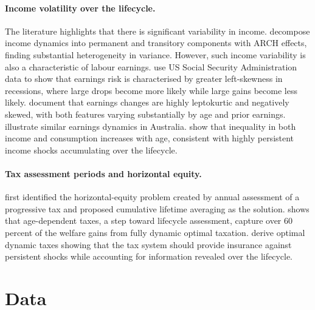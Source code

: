 \documentclass[12pt,a4paper]{article}
\begin{document}
\paragraph{Income volatility over the lifecycle.} The literature highlights that there is significant variability in income. \citet{MeghirPistaferri2004} decompose income dynamics into permanent and transitory components with ARCH effects, finding substantial heterogeneity in variance. However, such income variability is also a characteristic of labour earnings. \citet{GuvenOzkanSong2014} use US Social Security Administration data to show that earnings risk is characterised by greater left-skewness in recessions, where large drops become more likely while large gains become less likely. \citet{GuvenEtal2021} document that earnings changes are highly leptokurtic and negatively skewed, with both features varying substantially by age and prior earnings. \citet{Tinetal2025} illustrate similar earnings dynamics in Australia. \citet{StorTelmerYaron2004} show that inequality in both income and consumption increases with age, consistent with highly persistent income shocks accumulating over the lifecycle.

\paragraph{Tax assessment periods and horizontal equity.} \citet{Vickrey1939, Vickrey1947} first identified the horizontal-equity problem created by annual assessment of a progressive tax and proposed cumulative lifetime averaging as the solution. \citet{Weinzierl2011} shows that age-dependent taxes, a step toward lifecycle assessment, capture over 60 percent of the welfare gains from fully dynamic optimal taxation. \citet{FarhiWerning2013} derive optimal dynamic taxes showing that the tax system should provide insurance against persistent shocks while accounting for information revealed over the lifecycle. %



\section{Data}
\end{document}
